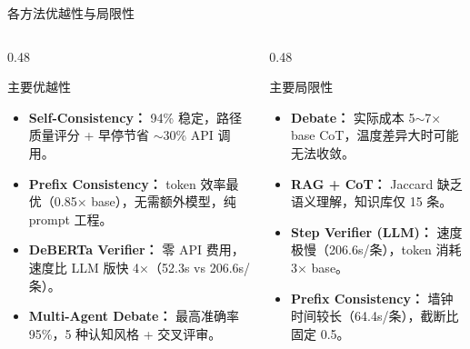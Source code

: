 \documentclass[10pt,aspectratio=169]{beamer}
\newcommand{\tightitems}{\setlength{\itemsep}{0.24em}}
\begin{document}
\begin{frame}{各方法优越性与局限性}
  \small
  \begin{columns}[T,onlytextwidth]
    \begin{column}{0.48\textwidth}
      \begin{block}{主要优越性}
        \begin{itemize}
          \tightitems
          \item \textbf{Self-Consistency：} 94\% 稳定，路径质量评分 + 早停节省 $\sim$30\% API 调用。
          \item \textbf{Prefix Consistency：} token 效率最优（0.85× base），无需额外模型，纯 prompt 工程。
          \item \textbf{DeBERTa Verifier：} 零 API 费用，速度比 LLM 版快 4×（52.3s vs 206.6s/条）。
          \item \textbf{Multi-Agent Debate：} 最高准确率 95\%，5 种认知风格 + 交叉评审。
        \end{itemize}
      \end{block}
    \end{column}
    \begin{column}{0.48\textwidth}
      \begin{block}{主要局限性}
        \begin{itemize}
          \tightitems
          \item \textbf{Debate：} 实际成本 5$\sim$7× base CoT，温度差异大时可能无法收敛。
          \item \textbf{RAG + CoT：} Jaccard 缺乏语义理解，知识库仅 15 条。
          \item \textbf{Step Verifier (LLM)：} 速度极慢（206.6s/条），token 消耗 3× base。
          \item \textbf{Prefix Consistency：} 墙钟时间较长（64.4s/条），截断比固定 0.5。
        \end{itemize}
      \end{block}
    \end{column}
  \end{columns}
\end{frame}
\end{document}
